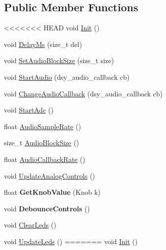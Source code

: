 \subsection*{Public Member Functions}
\begin{DoxyCompactItemize}
\item 
<<<<<<< HEAD
void \hyperlink{classdaisy_1_1_daisy_pod_a1a01a9e39345cdf1f207938fd988d26a}{Init} ()
\item 
void \hyperlink{classdaisy_1_1_daisy_pod_ac6a34858e9341fafa30d8cec8619a96f}{Delay\+Ms} (size\+\_\+t del)
\item 
void \hyperlink{classdaisy_1_1_daisy_pod_ac05d6bd0d67760e875c2071652fa0ff3}{Set\+Audio\+Block\+Size} (size\+\_\+t size)
\item 
void \hyperlink{classdaisy_1_1_daisy_pod_a765da8887de68b071367d6a88ac54cf2}{Start\+Audio} (dsy\+\_\+audio\+\_\+callback cb)
\item 
void \hyperlink{classdaisy_1_1_daisy_pod_a65e2919087209592aa41260b4e91dc26}{Change\+Audio\+Callback} (dsy\+\_\+audio\+\_\+callback cb)
\item 
void \hyperlink{classdaisy_1_1_daisy_pod_ac98cbdd0e34ec2cb994ca012f05e6317}{Start\+Adc} ()
\item 
float \hyperlink{classdaisy_1_1_daisy_pod_a228688fe03c569148141a8826fb20460}{Audio\+Sample\+Rate} ()
\item 
size\+\_\+t \hyperlink{classdaisy_1_1_daisy_pod_a25c3695cb0ef36eb6c64fc4fdeaf2d07}{Audio\+Block\+Size} ()
\item 
float \hyperlink{classdaisy_1_1_daisy_pod_aa31d4e642c9b46a23927cd3cc2d8cec7}{Audio\+Callback\+Rate} ()
\item 
void \hyperlink{classdaisy_1_1_daisy_pod_a2c20c15231d0ef1477a9bf3a7868d4d9}{Update\+Analog\+Controls} ()
\item 
\mbox{\label{classdaisy_1_1_daisy_pod_a8c4ae1af60b078bb71e6b86a3cf8cf5a}} 
float {\bfseries Get\+Knob\+Value} (Knob k)
\item 
\mbox{\label{classdaisy_1_1_daisy_pod_a409568a59ac47f55ca1d199b48f86cbd}} 
void {\bfseries Debounce\+Controls} ()
\item 
void \hyperlink{classdaisy_1_1_daisy_pod_a9bc2e391f7e1a29f04151f82003d88da}{Clear\+Leds} ()
\item 
void \hyperlink{classdaisy_1_1_daisy_pod_a77da50cfdca4810687adde08a4913135}{Update\+Leds} ()
=======
void \hyperlink{classdaisy_1_1_daisy_pod_a8b977ffb529c9a798e97037ec33424b0}{Init} ()

\end{DoxyCompactItemize}

